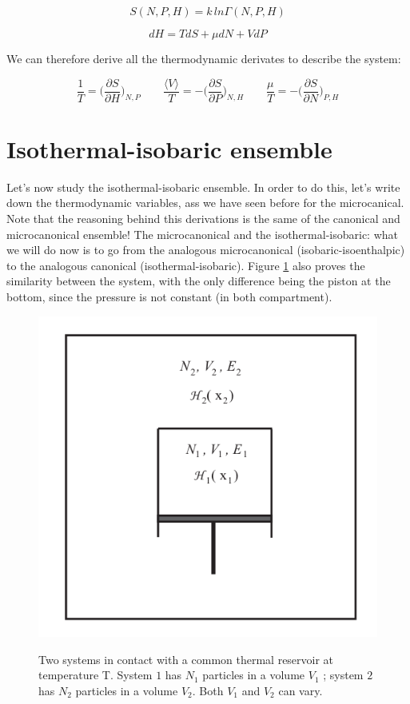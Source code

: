 	$$S(N, P, H) = k \, ln \Gamma(N, P, H)$$

	$$dH = TdS + \mu dN + VdP$$
	
	We can therefore derive all the thermodynamic derivates to describe the system:
 
	$$\frac{1}{T} = \biggl(\frac{\partial S}{\partial H}\biggr)_{N, P}\qquad \frac{\langle V\rangle}{T} = -\biggl(\frac{\partial S}{\partial P}\biggr)_{N, H}\qquad \frac{\mu}{T} = -\biggl(\frac{\partial S}{\partial N}\biggr)_{P, H}$$

\section{Isothermal-isobaric ensemble}
Let's now study the isothermal-isobaric ensemble. In order to do this, let's write down the thermodynamic variables, ass we have seen before for the microcanical.
Note that the reasoning behind this derivations is the same of the canonical and microcanonical ensemble! 
The microcanonical and the isothermal-isobaric: what we will do now is to go from the analogous microcanonical (isobaric-isoenthalpic) to the analogous canonical (isothermal-isobaric). 
Figure \ref{fig:isobar} also proves the similarity between the system, with the only difference being the piston at the bottom, since the pressure is not constant (in both compartment).

\begin{figure}
\center
\includegraphics[scale=0.4]{isobar}
\label{fig:isobar}
\caption{Two systems in contact with a common thermal reservoir at temperature T. System
$1$ has $N_1$ particles in a volume $V_1$ ; system $2$ has $N_2$ particles in a volume $V_2$. Both $V_1$ and $V_2$ can vary.}
\end{figure}

